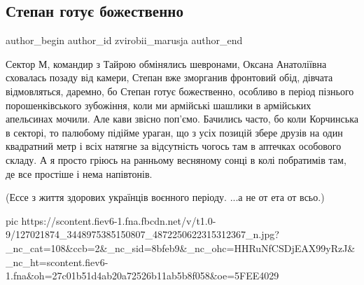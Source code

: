  
 
 
 
 
 
\subsection{Степан готує божественно}
\label{sec:22_11_2020.fb.zvirobii_marusja.1.stepan_gotuje}
\ifcmt
	author_begin
   author_id zvirobii_marusja
	author_end
\fi

Сектор М, командир з Тайрою обмінялись шевронами, Оксана Анатоліївна сховалась
позаду від камери, Степан вже зморганив фронтовий обід, дівчата відмовляться,
даремно, бо Степан готує божественно, особливо в період пізнього
порошенківського зубожіння, коли ми армійські шашлики в армійських апельсинах
мочили. Але кави звісно поп'ємо. Бачились часто, бо коли Корчинська в секторі,
то палюбому підійме ураган, що з усіх позицій збере друзів на один квадратний
метр і всіх натягне за відсутність чогось там в аптечках особового складу. А я
просто гріюсь на ранньому весняному сонці в колі побратимів там, де все
простіше і нема напівтонів.

(Ессе з життя здорових українців воєнного періоду. ...а не от ета от всьо.)

\ifcmt
pic https://scontent.fiev6-1.fna.fbcdn.net/v/t1.0-9/127021874_3448975385150807_4872250622315312367_n.jpg?_nc_cat=108&ccb=2&_nc_sid=8bfeb9&_nc_ohc=HHRuNfCSDjEAX99yRzJ&_nc_ht=scontent.fiev6-1.fna&oh=27c01b51d4ab20a72526b11ab5b8f058&oe=5FEE4029
\fi
